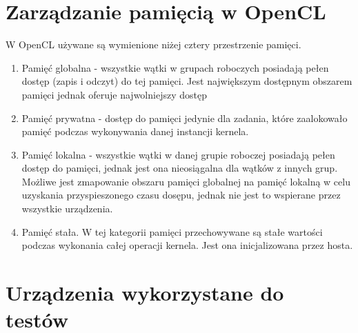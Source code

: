 \section{Zarządzanie pamięcią w OpenCL}
W OpenCL używane są wymienione niżej cztery przestrzenie pamięci.
\begin{enumerate}
  \item Pamięć globalna - wszystkie wątki w grupach roboczych posiadają pełen dostęp (zapis i odczyt) do tej pamięci. Jest największym dostępnym obszarem pamięci jednak oferuje najwolniejszy dostęp
  \item Pamięć prywatna - dostęp do pamięci jedynie dla zadania, które zaalokowało pamięć podczas wykonywania danej instancji kernela.
  \item Pamięć lokalna - wszystkie wątki w danej grupie roboczej posiadają pełen dostęp do pamięci, jednak jest ona nieosiągalna dla wątków z innych grup. Możliwe jest zmapowanie obszaru pamięci globalnej na pamięć lokalną w celu uzyskania przyspieszonego czasu dosępu, jednak nie jest to wspierane przez wszystkie urządzenia.
  \item Pamięć stała. W tej kategorii pamięci przechowywane są stałe wartości podczas wykonania całej operacji kernela. Jest ona inicjalizowana przez hosta.
\end{enumerate}

\section{Urządzenia wykorzystane do testów}
